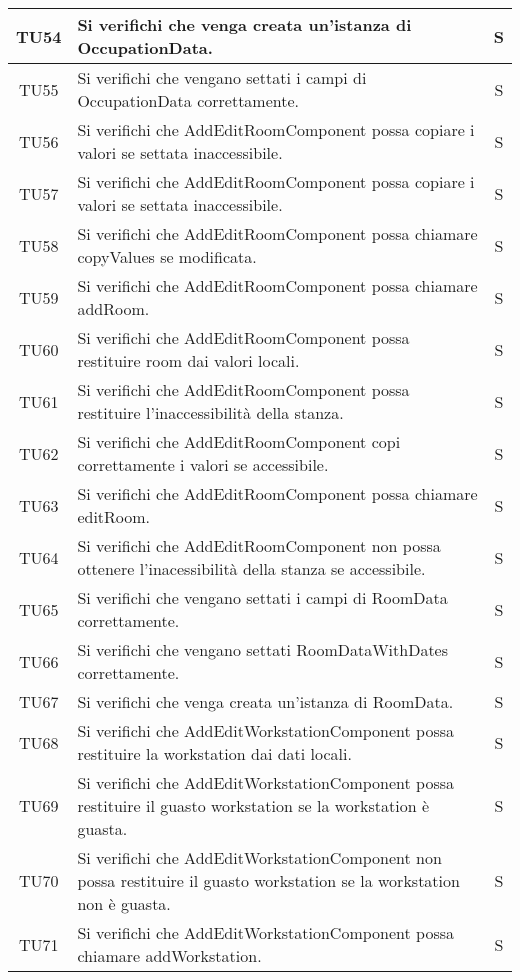 \begin{center}
\begin{longtable}{|c|p{10cm}|c|}
			\hline
			TU54 & Si verifichi che venga creata un'istanza di OccupationData. & S \\	
			\hline
			TU55 & Si verifichi che vengano settati i campi di OccupationData correttamente. & S \\	
			\hline
			TU56 & Si verifichi che AddEditRoomComponent possa copiare i valori se settata inaccessibile. & S \\	
			\hline
			TU57 & Si verifichi che AddEditRoomComponent possa copiare i valori se settata inaccessibile. & S \\	
			\hline
			TU58 & Si verifichi che AddEditRoomComponent possa chiamare copyValues se modificata. & S \\	
			\hline
			TU59 & Si verifichi che AddEditRoomComponent possa chiamare addRoom. & S \\	
			\hline
			TU60 & Si verifichi che AddEditRoomComponent possa restituire room dai valori locali. & S \\	
			\hline
			TU61 & Si verifichi che AddEditRoomComponent possa restituire l'inaccessibilità della stanza. & S \\	
			\hline
			TU62 & Si verifichi che AddEditRoomComponent copi correttamente i valori se accessibile. & S \\	
			\hline
			TU63 & Si verifichi che AddEditRoomComponent possa chiamare editRoom. & S \\	
			\hline
			TU64 & Si verifichi che AddEditRoomComponent non possa ottenere l'inacessibilità della stanza se accessibile. & S \\	
			\hline
			TU65 & Si verifichi che vengano settati i campi di RoomData correttamente. & S \\	
			\hline
			TU66 & Si verifichi che vengano settati RoomDataWithDates correttamente. & S \\	
			\hline
			TU67 & Si verifichi che venga creata un'istanza di RoomData. & S \\	
			\hline
			TU68 & Si verifichi che AddEditWorkstationComponent possa restituire la workstation dai dati locali. & S \\	
			\hline
			TU69 & Si verifichi che AddEditWorkstationComponent possa restituire il guasto workstation se la workstation è guasta. & S \\	
			\hline
			TU70 & Si verifichi che AddEditWorkstationComponent non possa restituire il guasto workstation se la workstation non è guasta. & S \\	
			\hline
			TU71 & Si verifichi che AddEditWorkstationComponent possa chiamare addWorkstation. & S \\	

\end{longtable}
\end{center}
